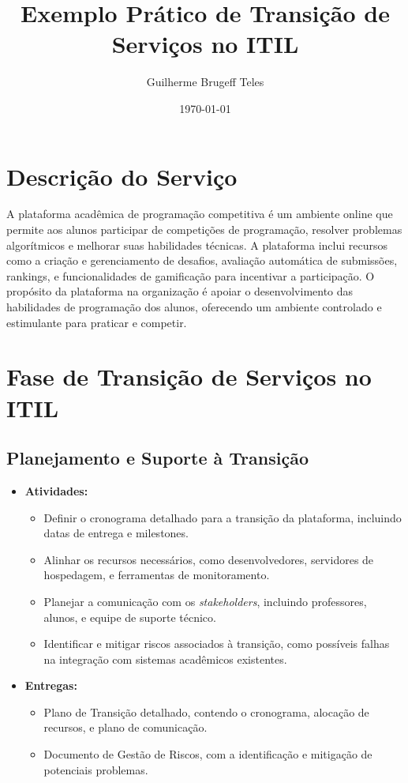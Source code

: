 \documentclass{article}
\title{Exemplo Prático de Transição de Serviços no ITIL}
\author{Guilherme Brugeff Teles}
\date{\mydate\today}
\begin{document}
\maketitle

\section{Descrição do Serviço}

A plataforma acadêmica de programação competitiva é um ambiente online que permite aos alunos participar de competições de programação, resolver problemas algorítmicos e melhorar suas habilidades técnicas. A plataforma inclui recursos como a criação e gerenciamento de desafios, avaliação automática de submissões, rankings, e funcionalidades de gamificação para incentivar a participação. O propósito da plataforma na organização é apoiar o desenvolvimento das habilidades de programação dos alunos, oferecendo um ambiente controlado e estimulante para praticar e competir.

\section{Fase de Transição de Serviços no ITIL}

\subsection{Planejamento e Suporte à Transição}
\begin{itemize}
    \item \textbf{Atividades:}
    \begin{itemize}
        \item Definir o cronograma detalhado para a transição da plataforma, incluindo datas de entrega e milestones.
        \item Alinhar os recursos necessários, como desenvolvedores, servidores de hospedagem, e ferramentas de monitoramento.
        \item Planejar a comunicação com os \textit{stakeholders}, incluindo professores, alunos, e equipe de suporte técnico.
        \item Identificar e mitigar riscos associados à transição, como possíveis falhas na integração com sistemas acadêmicos existentes.
    \end{itemize}
    \item \textbf{Entregas:}
    \begin{itemize}
        \item Plano de Transição detalhado, contendo o cronograma, alocação de recursos, e plano de comunicação.
        \item Documento de Gestão de Riscos, com a identificação e mitigação de potenciais problemas.
    \end{itemize}
\end{itemize}
\end{document}
